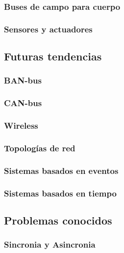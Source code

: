 \documentclass[10pt,onecolumn,twoside,letterpaper]{article}
\begin{document}
\subsubsection{Buses de campo para cuerpo}
\subsubsection{Sensores y actuadores}
\subsection{Futuras tendencias}
\subsubsection{BAN-bus}
\subsubsection{CAN-bus}
\subsubsection{Wireless}
\subsubsection{Topolog\'ias de red}
\subsubsection{Sistemas basados en eventos}
\subsubsection{Sistemas basados en tiempo}
\subsection{Problemas conocidos}
\subsubsection{Sincronia y Asincronia}
\end{document}

